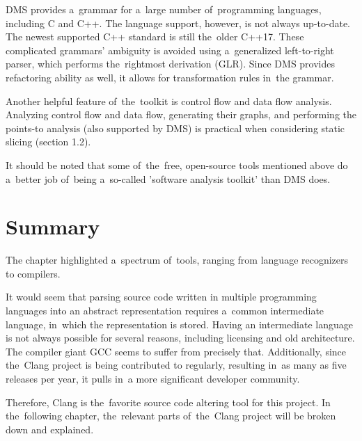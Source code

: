 DMS provides a~grammar for a~large number of~programming languages, 
including C and C++.
The language support, however, is not always up-to-date.
The newest supported C++ standard is still the~older C++17.
These complicated grammars' ambiguity is avoided using a~generalized 
left-to-right parser, which performs the~rightmost derivation (GLR).
Since DMS provides refactoring ability as well, it allows for transformation 
rules in~the grammar.

Another helpful feature of~the~toolkit is control flow and data flow analysis.
Analyzing control flow and data flow, generating their graphs, and performing 
the points-to analysis (also supported by DMS) is practical when considering
static slicing (section 1.2).

It should be noted that some of~the~free, open-source tools mentioned above 
do a~better job of~being a~so-called 'software analysis toolkit' than 
DMS does.

\section{Summary}

The chapter highlighted a~spectrum of~tools, ranging from language
recognizers to compilers.

It would seem that parsing source code written in multiple programming 
languages into an abstract representation requires a~common intermediate 
language, in~which the representation is stored. 
Having an intermediate language is not always possible for several reasons, 
including licensing and old architecture. 
The compiler giant GCC seems to suffer from precisely that.
Additionally, since the~Clang project is being contributed to regularly, 
resulting in~as many as five releases per year, 
it pulls in~a more significant developer community. 

Therefore, Clang is the~favorite source code altering tool for this project. 
In the~following chapter, the~relevant parts of~the~Clang project 
will be broken down and explained.

